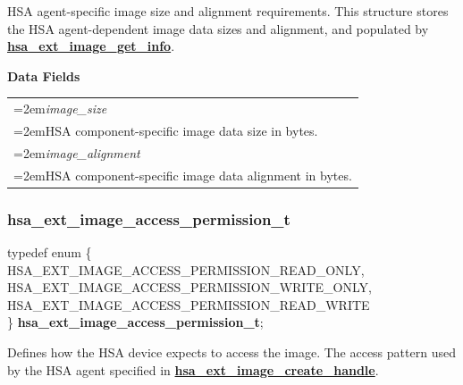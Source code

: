 \documentclass[final,oneside]{book}
\newcommand{\reffun}[1]{\textbf{#1}}
\newcommand{\reffld}[1]{\textit{#1}}
\newcommand{\reftyp}[1]{#1}
\newcommand{\refenu}[1]{\reftyp{#1}}
\newenvironment{mylongtable}{\rowcolors{0}{lightgray}{lightgray}\longtable} {
\endlongtable}
\begin{document}
\vspace{-5mm}HSA agent-specific image size and alignment requirements. This structure stores the HSA agent-dependent image data sizes and alignment, and populated by \hyperlink{group__ext-images_1ga432c568dc14e2bf78b3d2de2ecda3b1d}{\reffun{hsa_\-ext_\-image_\-get_\-info}}.

\noindent\textbf{Data Fields}\\[-6mm]
\begin{longtable}{@{}>{\hangindent=2em}p{\textwidth}}
\hypertarget{hsa_\-ext_\-image_\-info_\-t.image_\-size}{\reffld{image_\-size}}\\\hspace{2em}HSA component-specific image data size in bytes.\\[2mm]
\hypertarget{hsa_\-ext_\-image_\-info_\-t.image_\-alignment}{\reffld{image_\-alignment}}\\\hspace{2em}HSA component-specific image data alignment in bytes.
\end{longtable}



\subsubsection{hsa_\-ext_\-image_\-access_\-permission_\-t}
\vspace{-5.5mm}\begin{mylongtable}{@{}p{\textwidth}}
\rule{0pt}{3ex}typedef enum \{\\\hspace{1.7em}\hypertarget{group__ext-images_1ggab659478436fb8b92eae3ffe55f09e913a71094ed618e4e51e26a7f8c19e1fcaf3}{\refenu{HSA_\-EXT_\-IMAGE_\-ACCESS_\-PERMISSION_\-READ_\-ONLY}},\\
\hspace{1.7em}\hypertarget{group__ext-images_1ggab659478436fb8b92eae3ffe55f09e913a92d8fe67219c916c4afd249d9a957642}{\refenu{HSA_\-EXT_\-IMAGE_\-ACCESS_\-PERMISSION_\-WRITE_\-ONLY}},\\
\hspace{1.7em}\hypertarget{group__ext-images_1ggab659478436fb8b92eae3ffe55f09e913ae4f22cb73c17d46bf667e762f102ccf5}{\refenu{HSA_\-EXT_\-IMAGE_\-ACCESS_\-PERMISSION_\-READ_\-WRITE}}\\
\} \hypertarget{group__ext-images_1gab659478436fb8b92eae3ffe55f09e913}{\textbf{hsa_\-ext_\-image_\-access_\-permission_\-t}};\rule[-2ex]{0pt}{0pt}\end{mylongtable}
\vspace{-5mm}Defines how the HSA device expects to access the image. The access pattern used by the HSA agent specified in \hyperlink{group__ext-images_1ga98fa217ba0209e3e5c2a69feef7647f5}{\reffun{hsa_\-ext_\-image_\-create_\-handle}}.
\end{document}
